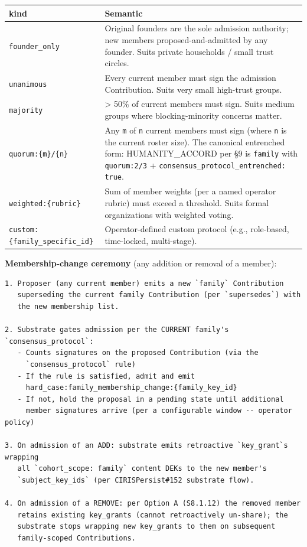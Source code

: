 \documentclass[10pt]{article}
\begin{document}
{\footnotesize
\begin{longtable}{|p{8.0cm}|p{8.0cm}|}\hline
\textbf{kind} & \textbf{Semantic} \\ \hline\endhead
\texttt{founder\_only} & Original founders are the sole admission authority; new members proposed-and-admitted by any founder. Suits private households / small trust circles. \\ \hline
\texttt{unanimous} & Every current member must sign the admission Contribution. Suits very small high-trust groups. \\ \hline
\texttt{majority} & > 50\% of current members must sign. Suits medium groups where blocking-minority concerns matter. \\ \hline
\texttt{quorum:\{m\}/\{n\}} & Any \texttt{m} of \texttt{n} current members must sign (where \texttt{n} is the current roster size). The canonical entrenched form: HUMANITY\_ACCORD per §9 is \texttt{family} with \texttt{quorum:2/3} + \texttt{consensus\_protocol\_entrenched: true}. \\ \hline
\texttt{weighted:\{rubric\}} & Sum of member weights (per a named operator rubric) must exceed a threshold. Suits formal organizations with weighted voting. \\ \hline
\texttt{custom:\{family\_specific\_id\}} & Operator-defined custom protocol (e.g., role-based, time-locked, multi-stage). \\ \hline
\end{longtable}}


\textbf{Membership-change ceremony} (any addition or removal of a member):


\begin{lstlisting}
1. Proposer (any current member) emits a new `family` Contribution
   superseding the current family Contribution (per `supersedes`) with
   the new membership list.

2. Substrate gates admission per the CURRENT family's `consensus_protocol`:
   - Counts signatures on the proposed Contribution (via the
     `consensus_protocol` rule)
   - If the rule is satisfied, admit and emit
     hard_case:family_membership_change:{family_key_id}
   - If not, hold the proposal in a pending state until additional
     member signatures arrive (per a configurable window -- operator policy)

3. On admission of an ADD: substrate emits retroactive `key_grant`s wrapping
   all `cohort_scope: family` content DEKs to the new member's
   `subject_key_ids` (per CIRISPersist#152 substrate flow).

4. On admission of a REMOVE: per Option A (S8.1.12) the removed member
   retains existing key_grants (cannot retroactively un-share); the
   substrate stops wrapping new key_grants to them on subsequent
   family-scoped Contributions.
\end{lstlisting}
\end{document}
